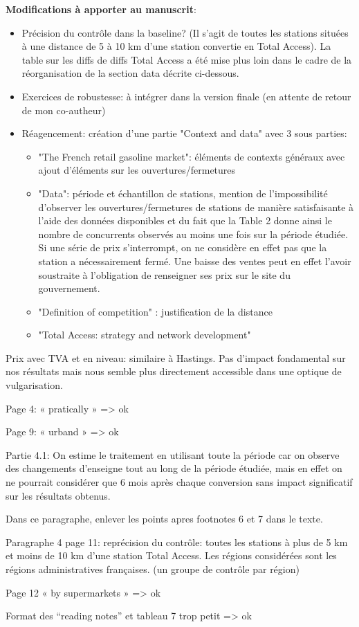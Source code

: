 \documentclass[11pt]{article}
\begin{document}
\textbf{Modifications à apporter au manuscrit}:
\begin{itemize}
  \item Précision du contrôle dans la baseline? (Il s'agit de toutes les stations situées à une distance de 5 à 10 km d'une station convertie en Total Access). La table sur les diffs de diffs Total Access a été mise plus loin dans le cadre de la réorganisation de la section data décrite ci-dessous.
	\item Exercices de robustesse: à intégrer dans la version finale (en attente de retour de mon co-autheur)
	\item Réagencement: création d'une partie "Context and data" avec 3 sous parties: 
		\begin{itemize} 
		\item "The French retail gasoline market": éléments de contexts généraux avec ajout d'éléments sur les ouvertures/fermetures
		\item "Data": période et échantillon de stations, mention de l'impossibilité d'observer les ouvertures/fermetures de stations de manière satisfaisante à l'aide des données disponibles et du fait que la Table 2 donne ainsi le nombre de concurrents observés au moins une fois sur la période étudiée. Si une série de prix s'interrompt, on ne considère en effet pas que la station a nécessairement fermé. Une baisse des ventes peut en effet l'avoir soustraite à l'obligation de renseigner ses prix sur le site du gouvernement.
		\item "Definition of competition" : justification de la distance
		\item "Total Access: strategy and network development"
		\end{itemize}
	\end{itemize}
	\item Prix avec TVA et en niveau: similaire à Hastings. Pas d'impact fondamental sur nos résultats mais nous semble plus directement accessible dans une optique de vulgarisation.
	\item Page 4: « pratically » => ok
  \item Page 9: « urband » => ok
	\item Partie 4.1: On estime le traitement en utilisant toute la période car on observe des changements d'enseigne tout au long de la période étudiée, mais en effet on ne pourrait considérer que 6 mois après chaque conversion sans impact significatif sur les résultats obtenus.
	\item Dans ce paragraphe, enlever les points apres footnotes 6 et 7 dans le texte.
	\item Paragraphe 4 page 11: reprécision du contrôle: toutes les stations à plus de 5 km et moins de 10 km d'une station Total Access. Les régions considérées sont les régions administratives françaises. (un groupe de contrôle par région)
	\item Page 12 « by supermarkets » => ok
	\item Format des “reading notes” et tableau 7 trop petit => ok
\end{document}
